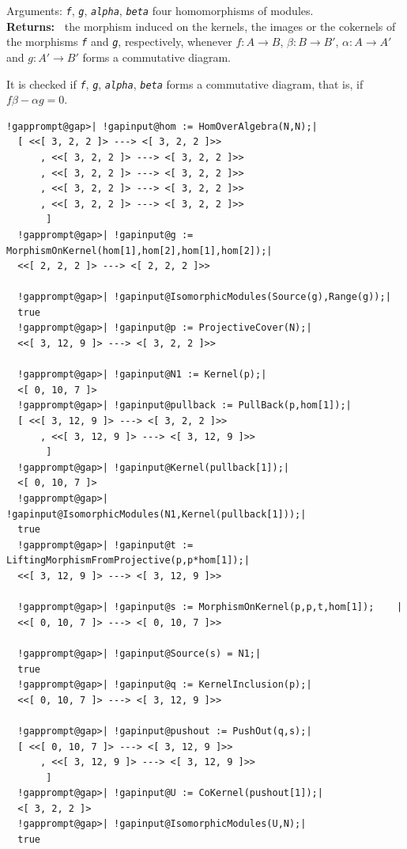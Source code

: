 \documentclass[a4paper,11pt]{report}
\begin{document}
{{{ Arguments: \mbox{\texttt{\mdseries\slshape f}}, \mbox{\texttt{\mdseries\slshape g}}, \mbox{\texttt{\mdseries\slshape alpha}}, \mbox{\texttt{\mdseries\slshape beta}} \texttt{} four homomorphisms of modules.\\
 \textbf{\indent Returns:\ }
the morphism induced on the kernels, the images or the cokernels of the
morphisms \mbox{\texttt{\mdseries\slshape f}} and \mbox{\texttt{\mdseries\slshape g}}, respectively, whenever $f\colon A\to B$, $\beta\colon B\to B'$, $\alpha\colon A\to A'$ and $g\colon A'\to B'$ forms a commutative diagram.



 It is checked if \mbox{\texttt{\mdseries\slshape f}}, \mbox{\texttt{\mdseries\slshape g}}, \mbox{\texttt{\mdseries\slshape alpha}}, \mbox{\texttt{\mdseries\slshape beta}} forms a commutative diagram, that is, if $f \beta - \alpha g = 0$. }

 
\begin{Verbatim}[commandchars=!@|,fontsize=\small,frame=single,label=Example]
  !gapprompt@gap>| !gapinput@hom := HomOverAlgebra(N,N);|
  [ <<[ 3, 2, 2 ]> ---> <[ 3, 2, 2 ]>>
      , <<[ 3, 2, 2 ]> ---> <[ 3, 2, 2 ]>>
      , <<[ 3, 2, 2 ]> ---> <[ 3, 2, 2 ]>>
      , <<[ 3, 2, 2 ]> ---> <[ 3, 2, 2 ]>>
      , <<[ 3, 2, 2 ]> ---> <[ 3, 2, 2 ]>>
       ]
  !gapprompt@gap>| !gapinput@g := MorphismOnKernel(hom[1],hom[2],hom[1],hom[2]);|
  <<[ 2, 2, 2 ]> ---> <[ 2, 2, 2 ]>>
  
  !gapprompt@gap>| !gapinput@IsomorphicModules(Source(g),Range(g));|
  true
  !gapprompt@gap>| !gapinput@p := ProjectiveCover(N);|
  <<[ 3, 12, 9 ]> ---> <[ 3, 2, 2 ]>>
  
  !gapprompt@gap>| !gapinput@N1 := Kernel(p);|
  <[ 0, 10, 7 ]>
  !gapprompt@gap>| !gapinput@pullback := PullBack(p,hom[1]);|
  [ <<[ 3, 12, 9 ]> ---> <[ 3, 2, 2 ]>>
      , <<[ 3, 12, 9 ]> ---> <[ 3, 12, 9 ]>>
       ]
  !gapprompt@gap>| !gapinput@Kernel(pullback[1]);|
  <[ 0, 10, 7 ]>
  !gapprompt@gap>| !gapinput@IsomorphicModules(N1,Kernel(pullback[1]));|
  true
  !gapprompt@gap>| !gapinput@t := LiftingMorphismFromProjective(p,p*hom[1]);|
  <<[ 3, 12, 9 ]> ---> <[ 3, 12, 9 ]>>
  
  !gapprompt@gap>| !gapinput@s := MorphismOnKernel(p,p,t,hom[1]);    |
  <<[ 0, 10, 7 ]> ---> <[ 0, 10, 7 ]>>
  
  !gapprompt@gap>| !gapinput@Source(s) = N1;|
  true
  !gapprompt@gap>| !gapinput@q := KernelInclusion(p);|
  <<[ 0, 10, 7 ]> ---> <[ 3, 12, 9 ]>>
  
  !gapprompt@gap>| !gapinput@pushout := PushOut(q,s);|
  [ <<[ 0, 10, 7 ]> ---> <[ 3, 12, 9 ]>>
      , <<[ 3, 12, 9 ]> ---> <[ 3, 12, 9 ]>>
       ]
  !gapprompt@gap>| !gapinput@U := CoKernel(pushout[1]);|
  <[ 3, 2, 2 ]>
  !gapprompt@gap>| !gapinput@IsomorphicModules(U,N);|
  true 
\end{Verbatim}
 

}}
\end{document}
